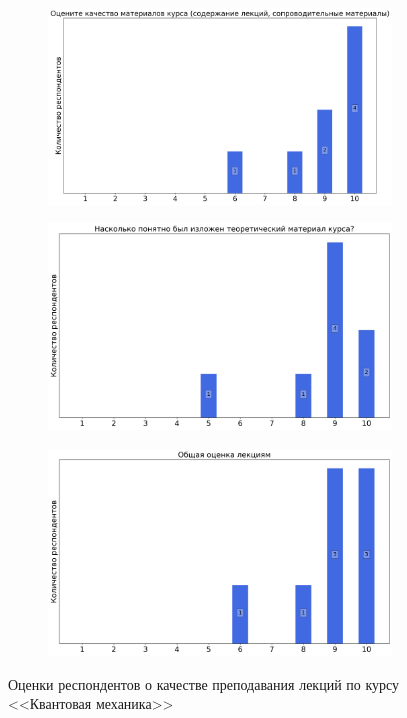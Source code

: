 \begin{figure}[H]
\begin{subfigure}[b]{0.45\textwidth}
				\includegraphics[width=\textwidth]{images/4 course/Квантовая механика/lecturer-marks-Дорофеенко А.В.-1.png}
			\end{subfigure}
			\begin{subfigure}[b]{0.45\textwidth}
				\centering
				\includegraphics[width=\textwidth]{images/4 course/Квантовая механика/lecturer-marks-Дорофеенко А.В.-2.png}
			\end{subfigure}	
			\begin{subfigure}[b]{0.45\textwidth}
				\centering
				\includegraphics[width=\textwidth]{images/4 course/Квантовая механика/lecturer-marks-Дорофеенко А.В.-3.png}
			\end{subfigure}
			\caption{Оценки респондентов о качестве преподавания лекций по курсу <<Квантовая механика>>}
		\end{figure}

